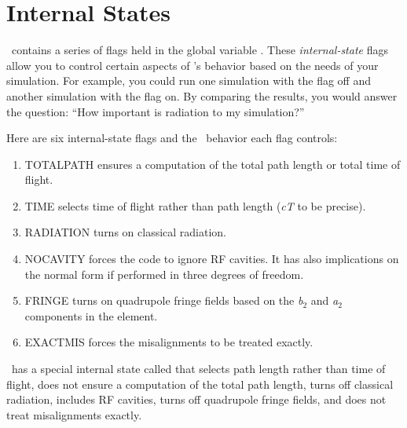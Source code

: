 
\cleardoublepage
\chapter{Internal States}
\label{app:states}

%
\PTC\ contains a series of flags held in the global variable .
These \emph{internal-state} flags allow you to control certain aspects of \PTC's behavior
based on the needs of your simulation. For example, you could run one simulation
with the flag off and another simulation with the flag on.
By comparing the results, you would answer the question: ``How important is
radiation to my simulation?''

Here are six internal-state flags and the \PTC\ behavior each flag controls:

\begin{enumerate}
  \item TOTALPATH ensures a computation of the total path length
or total time of flight.
  \item TIME selects time of flight rather than path length (\emph{cT} to
be precise).
  \item RADIATION turns on classical radiation.
  \item NOCAVITY forces the code to ignore RF cavities. It has also implications
on the normal form if performed in three degrees of freedom.
  \item FRINGE turns on quadrupole fringe fields based on the \emph{b$_{2}$}
and \emph{a$_{2}$} components in the element.
  \item EXACTMIS forces the misalignments to be treated exactly.
\end{enumerate}

\PTC\ has a special internal state called that selects path length
rather than time of flight, does not ensure a computation of the total path length,
turns off classical radiation, includes RF cavities, turns off quadrupole fringe fields,
and does not treat misalignments exactly.

